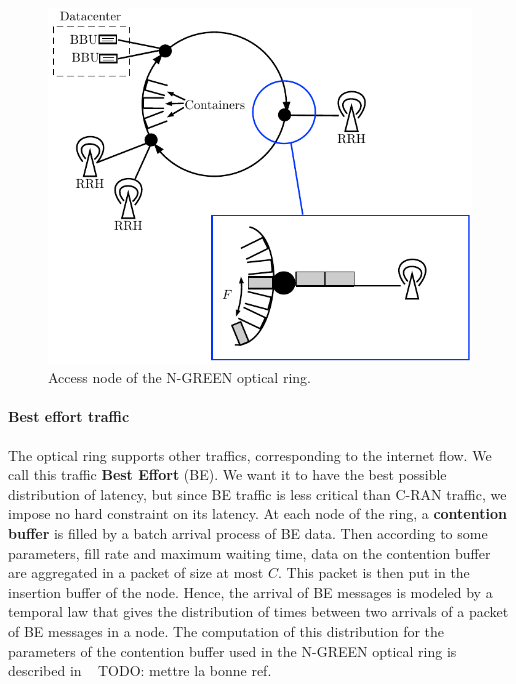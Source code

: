 \documentclass[10pt, conference, letterpaper]{IEEEtran}
\newcommand{\todo}[1]{{\color{red} TODO: {#1}}}
\begin{document}
    
\begin{figure}[h!]
\begin{center}   

      \includegraphics[scale=0.7]{interface.pdf}
     \caption{Access node of the N-GREEN optical ring.}\label{fig:interface}
     
\end{center}
  \end{figure}


\paragraph{Best effort traffic}

The optical ring supports other traffics, corresponding to the internet flow. We call this traffic \textbf{Best Effort} (BE). We want it to have the best possible distribution of latency, but since BE traffic is less critical than C-RAN traffic, we impose no hard constraint on its latency. At each node of the ring, a {\bf contention buffer} is filled by a batch arrival process of BE data. Then according to some parameters, fill rate and maximum waiting time, data on the contention buffer are aggregated in a packet of size at most $C$. This packet is then put in the insertion buffer of the node. Hence, the arrival of BE messages is modeled by a temporal law that gives the distribution of times between two arrivals of a packet of BE messages in a node. The computation of this distribution for the parameters of the contention buffer used in the N-GREEN optical ring is described in ~\cite{youssef2018}\todo{mettre la bonne ref}.
\end{document}
